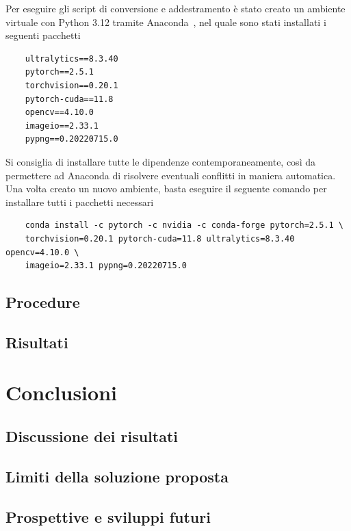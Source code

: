\documentclass[12pt]{report}
\begin{document}
Per eseguire gli script di conversione e addestramento è stato creato un ambiente virtuale con Python 3.12 tramite Anaconda~\cite{anaconda}, nel quale sono stati installati i seguenti pacchetti

\begin{verbatim}
	ultralytics==8.3.40
	pytorch==2.5.1
	torchvision==0.20.1
	pytorch-cuda==11.8
	opencv==4.10.0
	imageio==2.33.1
	pypng==0.20220715.0
\end{verbatim}

Si consiglia di installare tutte le dipendenze contemporaneamente, così da permettere ad Anaconda di risolvere eventuali conflitti in maniera automatica. Una volta creato un nuovo ambiente, basta eseguire il seguente comando per installare tutti i pacchetti necessari

\begin{verbatim}
	conda install -c pytorch -c nvidia -c conda-forge pytorch=2.5.1 \
	torchvision=0.20.1 pytorch-cuda=11.8 ultralytics=8.3.40 opencv=4.10.0 \
	imageio=2.33.1 pypng=0.20220715.0
\end{verbatim}

\section{Procedure}
\label{procedure}

\section{Risultati}
\label{risultati}

\chapter{Conclusioni}
\label{chap:conclusioni}

\section{Discussione dei risultati}
\label{chap:discussione_risultati}

\section{Limiti della soluzione proposta}
\label{chap:limiti}

\section{Prospettive e sviluppi futuri}
\label{chap:prospettive}

\beforebibliography



\closingpage
\end{document}
